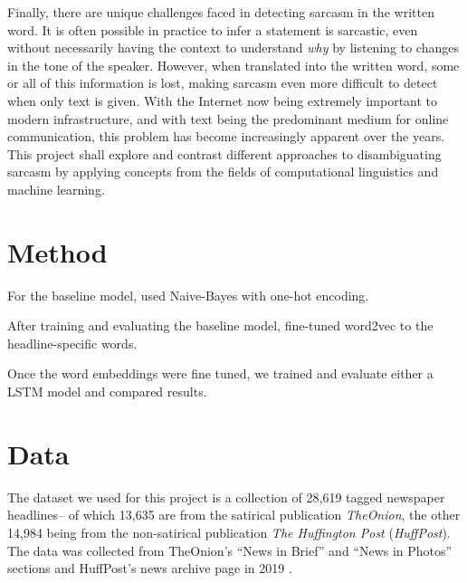 \documentclass[11pt]{article}
\begin{document}
Finally, there are unique challenges faced in detecting sarcasm in the written
word. It is often possible in practice to infer a statement is sarcastic, even
without necessarily having the context to understand \textit{why} by listening
to changes in the tone of the speaker. However, when translated into the
written word, some or all of this information is lost, making sarcasm even more
difficult to detect when only text is given. With the Internet now being
extremely important to modern infrastructure, and with text being the
predominant medium for online communication, this problem has become
increasingly apparent over the years. This project shall explore and contrast
different approaches to disambiguating sarcasm by applying concepts from the
fields of computational linguistics and machine learning.

\section{Method}

For the baseline model, used Naive-Bayes with one-hot encoding.

After training and evaluating the baseline model,  fine-tuned
word2vec to the headline-specific words.

Once the word embeddings were fine tuned, we trained and
evaluate either a LSTM model and compared results.

\section{Data}

The dataset we used for this project is a collection of 28,619 tagged
newspaper headlines-- of which 13,635 are from the satirical publication
\textit{TheOnion}, the other 14,984 being from the non-satirical publication
\textit{The Huffington Post} (\textit{HuffPost}). The data was collected from
TheOnion's ``News in Brief'' and ``News in Photos'' sections and HuffPost's
news archive page in 2019
\cite{misra2023Sarcasm}.
\end{document}
